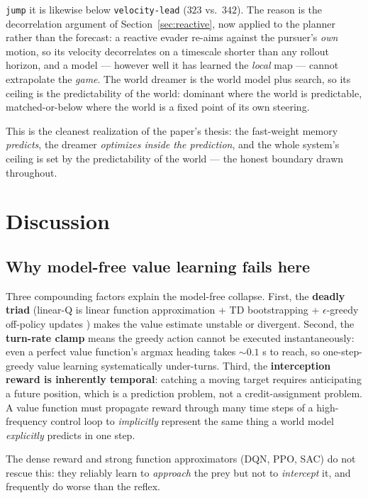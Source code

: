 \documentclass[11pt]{article}
\begin{document}
\begin{enumerate}
  \texttt{jump} it is likewise below \texttt{velocity-lead} ($323$ vs.\ $342$). The reason is the
  decorrelation argument of Section~\ref{sec:reactive}, now applied to the planner rather than the
  forecast: a reactive evader re-aims against the pursuer's \emph{own} motion, so its velocity
  decorrelates on a timescale shorter than any rollout horizon, and a model --- however well it has
  learned the \emph{local} map --- cannot extrapolate the \emph{game}. The world dreamer is the world
  model plus search, so its ceiling is the predictability of the world: dominant where the world is
  predictable, matched-or-below where the world is a fixed point of its own steering.
\end{enumerate}

This is the cleanest realization of the paper's thesis: the fast-weight memory \emph{predicts}, the
dreamer \emph{optimizes inside the prediction}, and the whole system's ceiling is set by the
predictability of the world --- the honest boundary drawn throughout.

\section{Discussion}\label{sec:discussion}

\subsection{Why model-free value learning fails here}

Three compounding factors explain the model-free collapse. First, the \textbf{deadly triad}
(linear-Q is linear function approximation + TD bootstrapping + $\epsilon$-greedy off-policy
updates \cite{sutton2018}) makes the value estimate unstable or divergent. Second, the
\textbf{turn-rate clamp} means the greedy action cannot be executed instantaneously: even a
perfect value function's argmax heading takes $\sim\!0.1$ s to reach, so one-step-greedy value
learning systematically under-turns. Third, the \textbf{interception reward is inherently
temporal}: catching a moving target requires anticipating a future position, which is a
prediction problem, not a credit-assignment problem. A value function must propagate reward
through many time steps of a high-frequency control loop to \emph{implicitly} represent the same
thing a world model \emph{explicitly} predicts in one step.

The dense reward and strong function approximators (DQN, PPO, SAC) do not rescue this: they
reliably learn to \emph{approach} the prey but not to \emph{intercept} it, and frequently do
worse than the reflex.
\end{document}
